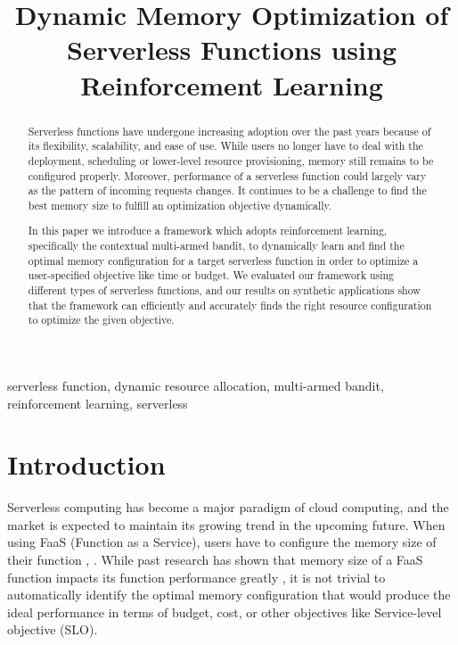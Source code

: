 \documentclass[conference]{IEEEtran}
\begin{document}
\title{Dynamic Memory Optimization of Serverless Functions using Reinforcement Learning\\

}

\author{
    \and
    \and
    \and
    \and
}

\maketitle

\begin{abstract}
Serverless functions have undergone increasing adoption over the past years because of its flexibility, scalability, and ease of use. While users no longer have to deal with the deployment, scheduling or lower-level resource provisioning, memory still remains to be configured properly. Moreover, performance of a serverless function could largely vary as the pattern of incoming requests changes. It continues to be a challenge to find the best memory size to fulfill an optimization objective dynamically. 

In this paper we introduce a framework which adopts reinforcement learning, specifically the contextual multi-armed bandit, to dynamically learn and find the optimal memory configuration for a target serverless function in order to optimize a user-specified objective like time or budget. We evaluated our framework using different types of serverless functions, and our results on synthetic applications show that the framework can efficiently and accurately finds the right resource configuration to optimize the given objective.
\end{abstract}

\begin{IEEEkeywords}
serverless function, dynamic resource allocation, multi-armed bandit, reinforcement learning, serverless
\end{IEEEkeywords}

\section{Introduction}
Serverless computing has become a major paradigm of cloud computing, and the market is expected to maintain its growing trend in the upcoming future. When using FaaS (Function as a Service), users have to configure the memory size of their function \cite{aws-lambda}, \cite{10.1145/3429880.3430094}. While past research has shown that memory size of a FaaS function impacts its function performance greatly \cite{10.1145/3464298.3493398}, it is not trivial to automatically identify the optimal memory configuration that would produce the ideal performance in terms of budget, cost, or other objectives like Service-level objective (SLO). 
\end{document}
